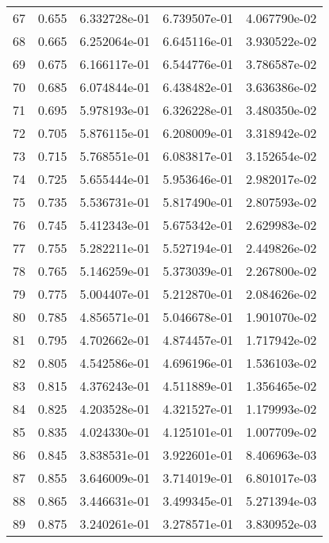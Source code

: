 \begin{table}[ht]
\begin{tabular}{rcccc}
    67 &  0.655 &    6.332728e-01 &    6.739507e-01  &     4.067790e-02\\ 
    68 &  0.665 &    6.252064e-01 &    6.645116e-01  &     3.930522e-02\\ 
    69 &  0.675 &    6.166117e-01 &    6.544776e-01  &     3.786587e-02\\ 
    70 &  0.685 &    6.074844e-01 &    6.438482e-01  &     3.636386e-02\\ 
    71 &  0.695 &    5.978193e-01 &    6.326228e-01  &     3.480350e-02\\ 
    72 &  0.705 &    5.876115e-01 &    6.208009e-01  &     3.318942e-02\\ 
    73 &  0.715 &    5.768551e-01 &    6.083817e-01  &     3.152654e-02\\ 
    74 &  0.725 &    5.655444e-01 &    5.953646e-01  &     2.982017e-02\\ 
    75 &  0.735 &    5.536731e-01 &    5.817490e-01  &     2.807593e-02\\ 
    76 &  0.745 &    5.412343e-01 &    5.675342e-01  &     2.629983e-02\\ 
    77 &  0.755 &    5.282211e-01 &    5.527194e-01  &     2.449826e-02\\ 
    78 &  0.765 &    5.146259e-01 &    5.373039e-01  &     2.267800e-02\\ 
    79 &  0.775 &    5.004407e-01 &    5.212870e-01  &     2.084626e-02\\ 
    80 &  0.785 &    4.856571e-01 &    5.046678e-01  &     1.901070e-02\\ 
    81 &  0.795 &    4.702662e-01 &    4.874457e-01  &     1.717942e-02\\ 
    82 &  0.805 &    4.542586e-01 &    4.696196e-01  &     1.536103e-02\\ 
    83 &  0.815 &    4.376243e-01 &    4.511889e-01  &     1.356465e-02\\ 
    84 &  0.825 &    4.203528e-01 &    4.321527e-01  &     1.179993e-02\\ 
    85 &  0.835 &    4.024330e-01 &    4.125101e-01  &     1.007709e-02\\ 
    86 &  0.845 &    3.838531e-01 &    3.922601e-01  &     8.406963e-03\\ 
    87 &  0.855 &    3.646009e-01 &    3.714019e-01  &     6.801017e-03\\ 
    88 &  0.865 &    3.446631e-01 &    3.499345e-01  &     5.271394e-03\\ 
    89 &  0.875 &    3.240261e-01 &    3.278571e-01  &     3.830952e-03\\ 

\end{tabular}
\end{table}
